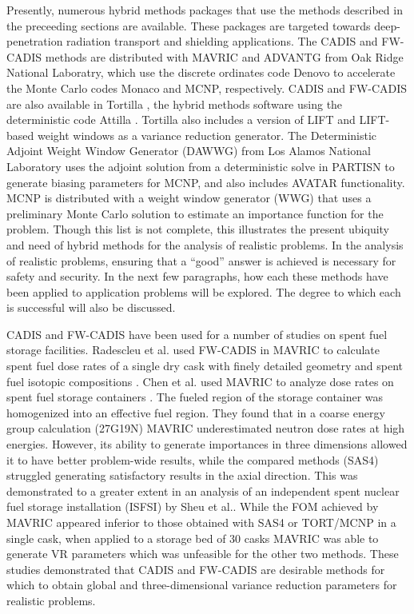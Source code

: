 Presently, numerous hybrid methods packages that use the methods described in
the preceeding sections are available. These packages are targeted towards
deep-penetration radiation transport and shielding applications.
The CADIS and FW-CADIS methods are distributed with MAVRIC \cite{SCALE6_1,
peplow_advanced_2007} and
ADVANTG \cite{mosher_automated_2009} from Oak Ridge National Laboratry, which
use the discrete ordinates code Denovo \cite{evans_denovo:_2010} to accelerate
the Monte Carlo codes Monaco \cite{SCALE6_1} and MCNP\cite{mcnp_manual_v1},
respectively. CADIS and FW-CADIS are also available in Tortilla
\cite{somasundaram_implementation_2013},
the hybrid methods software using the deterministic code Attilla
\cite{lucas_applications_2004}. Tortilla also includes a version of LIFT and
LIFT-based weight windows as a variance reduction generator.
The Deterministic Adjoint Weight Window
Generator (DAWWG) from Los Alamos National Laboratory
\cite{sweezy_automated_2005} uses the adjoint solution
from a deterministic solve in
PARTISN \cite{alcouffe_partisn_2002}
to generate biasing parameters for MCNP, and also includes AVATAR
functionality. MCNP \cite{mcnp_manual_v1} is distributed with a weight window
generator (WWG) that uses a preliminary Monte Carlo solution to estimate an
importance function for the problem. Though this list is not complete, this
illustrates the present ubiquity and need of hybrid methods for the analysis of
realistic problems. In the analysis of realistic problems, ensuring that a
``good'' answer is achieved is necessary for safety and security. In the next
few paragraphs, how each these methods have been applied to application problems
will be explored. The degree to which each is successful will also be discussed.

CADIS and FW-CADIS have been used for a number of studies on spent fuel storage
facilities.
Radescleu et al. used FW-CADIS in MAVRIC to calculate spent fuel
dose rates of a single dry cask
with finely detailed geometry and spent fuel isotopic compositions
\cite{radulescu_dose_2013}.
Chen et al. used MAVRIC \cite{SCALE6_1} to analyze dose rates on spent fuel
storage containers \cite{chen_surface_2011}. The fueled region of the storage
container was homogenized into an effective fuel region.
They found that in a coarse energy
group calculation (27G19N) MAVRIC underestimated neutron dose rates at high
energies. However, its ability to generate importances in three dimensions
allowed it to have better problem-wide results, while the compared methods
(SAS4) struggled generating satisfactory results in the axial direction. This
was demonstrated to a greater extent in an analysis of an independent spent
nuclear fuel storage installation (ISFSI) \cite{sheu_dose_2011} by Sheu et al..
While the FOM
achieved by MAVRIC appeared inferior to those obtained with SAS4 or TORT/MCNP in
a single cask, when applied to a storage bed of 30 casks MAVRIC was able to
generate VR parameters which was unfeasible for the other two methods. These
studies demonstrated that CADIS and FW-CADIS are desirable methods for which to
obtain global and three-dimensional variance reduction parameters for realistic
problems.

